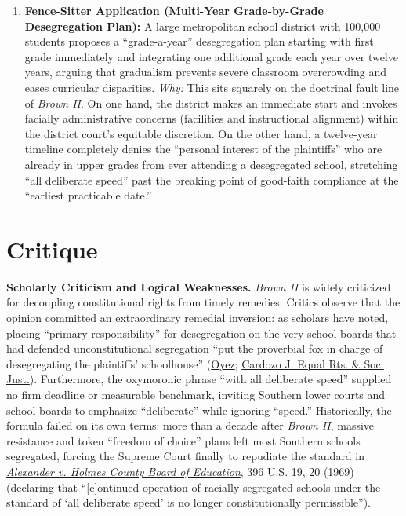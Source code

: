 \documentclass[12pt]{article}
\begin{document}
\begin{enumerate}
  \item \textbf{Fence-Sitter Application (Multi-Year Grade-by-Grade Desegregation Plan):} A large metropolitan school district with 100,000 students proposes a ``grade-a-year'' desegregation plan starting with first grade immediately and integrating one additional grade each year over twelve years, arguing that gradualism prevents severe classroom overcrowding and eases curricular disparities. \textit{Why:} This sits squarely on the doctrinal fault line of \textit{Brown II}. On one hand, the district makes an immediate start and invokes facially administrative concerns (facilities and instructional alignment) within the district court's equitable discretion. On the other hand, a twelve-year timeline completely denies the ``personal interest of the plaintiffs'' who are already in upper grades from ever attending a desegregated school, stretching ``all deliberate speed'' past the breaking point of good-faith compliance at the ``earliest practicable date.''
\end{enumerate}

\section{Critique}

\textbf{Scholarly Criticism and Logical Weaknesses.} \textit{Brown II} is widely criticized for decoupling constitutional rights from timely remedies. Critics observe that the opinion committed an extraordinary remedial inversion: as scholars have noted, placing ``primary responsibility'' for desegregation on the very school boards that had defended unconstitutional segregation ``put the proverbial fox in charge of desegregating the plaintiffs' schoolhouse'' (\href{https://www.oyez.org/cases/1940-1955/349us294}{Oyez}; \href{https://larc.cardozo.yu.edu/cgi/viewcontent.cgi?article=1204&context=cardozoersj}{Cardozo J. Equal Rts. \& Soc. Just.}). Furthermore, the oxymoronic phrase ``with all deliberate speed'' supplied no firm deadline or measurable benchmark, inviting Southern lower courts and school boards to emphasize ``deliberate'' while ignoring ``speed.'' Historically, the formula failed on its own terms: more than a decade after \textit{Brown II}, massive resistance and token ``freedom of choice'' plans left most Southern schools segregated, forcing the Supreme Court finally to repudiate the standard in \href{https://supreme.justia.com/cases/federal/us/396/19/}{\textit{Alexander v. Holmes County Board of Education}}, 396 U.S. 19, 20 (1969) (declaring that ``[c]ontinued operation of racially segregated schools under the standard of `all deliberate speed' is no longer constitutionally permissible'').
\end{document}
